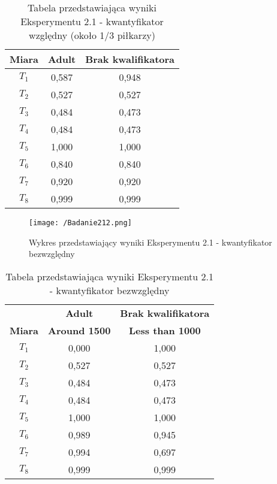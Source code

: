 \documentclass{classrep}
\begin{document}
\begin{table}[H]
	\centering
	\begin{tabular}{c c c} 
		\hline
		\textbf{Miara} & \textbf{Adult} & \textbf{Brak kwalifikatora}\\ [0.5ex] 
		\hline
		\hline 
        $T_1$ & 0,587 & 0,948\\
        $T_2$ & 0,527 & 0,527\\
        $T_3$ & 0,484 & 0,473\\
        $T_4$ & 0,484 & 0,473\\
        $T_5$ & 1,000 & 1,000\\
        $T_6$ & 0,840 & 0,840\\
        $T_7$ & 0,920 & 0,920\\
        $T_8$ & 0,999 & 0,999\\
		\hline
	\end{tabular}
	\caption{Tabela przedstawiająca wyniki Eksperymentu 2.1 - kwantyfikator względny (około 1/3 piłkarzy)}
\end{table}

\begin{figure}[H]
	\centering
	\texttt{[image: /Badanie212.png]}
	\caption{Wykres przedstawiający wyniki Eksperymentu 2.1 - kwantyfikator bezwzględny}
\end{figure}

\begin{table}[H]
	\centering
	\begin{tabular}{c c c } 
		\hline
		& \textbf{Adult} & \textbf{Brak kwalifikatora}\\ [0.5ex]
		\textbf{Miara} & \textbf{Around 1500} & \textbf{Less than 1000}\\ [0.5ex]
		\hline
		\hline 
        $T_1$ & 0,000 & 1,000\\
        $T_2$ & 0,527 & 0,527\\
        $T_3$ & 0,484 & 0,473\\
        $T_4$ & 0,484 & 0,473\\
        $T_5$ & 1,000 & 1,000\\
        $T_6$ & 0,989 & 0,945\\
        $T_7$ & 0,994 & 0,697\\
        $T_8$ & 0,999 & 0,999\\
		\hline
	\end{tabular}
	\caption{Tabela przedstawiająca wyniki Eksperymentu 2.1 - kwantyfikator bezwzględny}
\end{table}
\end{document}
